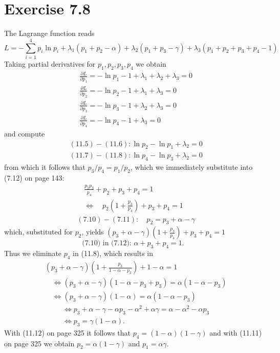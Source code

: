 \documentclass[10pt]{book}
\begin{document}
\section{Exercise 7.8}
The Lagrange function reads
\begin{equation*}
L=-\sum_{i=1}^{4} p_{i} \ln p_{i}+\lambda_{1}\left(p_{1}+p_{2}-\alpha\right)+\lambda_{2}\left(p_{1}+p_{3}-\gamma\right)+\lambda_{3}\left(p_{1}+p_{2}+p_{3}+p_{4}-1\right) \tag{11.4}
\end{equation*}
Taking partial derivatives for $p_{1}, p_{2}, p_{3}, p_{4}$ we obtain
\begin{align*}
& \frac{\partial L}{\partial p_{1}}=-\ln p_{1}-1+\lambda_{1}+\lambda_{2}+\lambda_{3}=0  \tag{11.5}\\
& \frac{\partial L}{\partial p_{2}}=-\ln p_{2}-1+\lambda_{1}+\lambda_{3}=0  \tag{11.6}\\
& \frac{\partial L}{\partial p_{3}}=-\ln p_{3}-1+\lambda_{2}+\lambda_{3}=0  \tag{11.7}\\
& \frac{\partial L}{\partial p_{4}}=-\ln p_{4}-1+\lambda_{3}=0 \tag{11.8}
\end{align*}
and compute
\begin{align*}
& (11.5)-(11.6): \ln p_{2}-\ln p_{1}+\lambda_{2}=0  \tag{11.9}\\
& (11.7)-(11.8): \ln p_{4}-\ln p_{3}+\lambda_{2}=0 \tag{11.10}
\end{align*}
from which it follows that $p_{3} / p_{4}=p_{1} / p_{2}$, which we immediately substitute into (7.12) on page 143:
\begin{align*}
& \quad \frac{p_{2} p_{3}}{p_{4}}+p_{2}+p_{3}+p_{4}=1 \\
& \quad \Leftrightarrow \quad p_{2}\left(1+\frac{p_{3}}{p_{4}}\right)+p_{3}+p_{4}=1  \tag{11.11}\\
& (7.10)-(7.11): \quad p_{2}=p_{3}+\alpha-\gamma
\end{align*}
which, substituted for $p_{2}$, yields $\left(p_{3}+\alpha-\gamma\right)\left(1+\frac{p_{3}}{p_{4}}\right)+p_{3}+p_{4}=1$
\begin{equation*}
\text{(7.10) in (7.12): } \alpha+p_{3}+p_{4}=1. \tag{11.12}
\end{equation*}
Thus we eliminate $p_{4}$ in (11.8), which results in
\begin{align*}
& \left(p_{3}+\alpha-\gamma\right)\left(1+\frac{p_{3}}{1-\alpha-p_{3}}\right)+1-\alpha=1  \tag{11.13}\\
& \quad \Leftrightarrow\left(p_{3}+\alpha-\gamma\right)\left(1-\alpha-p_{3}+p_{3}\right)=\alpha\left(1-\alpha-p_{3}\right)  \tag{11.14}\\
& \quad \Leftrightarrow\left(p_{3}+\alpha-\gamma\right)(1-\alpha)=\alpha\left(1-\alpha-p_{3}\right) \tag{11.15}
\end{align*}
\begin{align*}
& \Leftrightarrow p_{3}+\alpha-\gamma-\alpha p_{3}-\alpha^{2}+\alpha \gamma=\alpha-\alpha^{2}-\alpha p_{3}  \tag{11.16}\\
& \Leftrightarrow p_{3}=\gamma(1-\alpha). \tag{11.17}
\end{align*}
With (11.12) on page 325 it follows that $p_{4}=(1-\alpha)(1-\gamma)$ and with (11.11) on page 325 we obtain $p_{2}=\alpha(1-\gamma)$ and $p_{1}=\alpha \gamma$.
\end{document}
